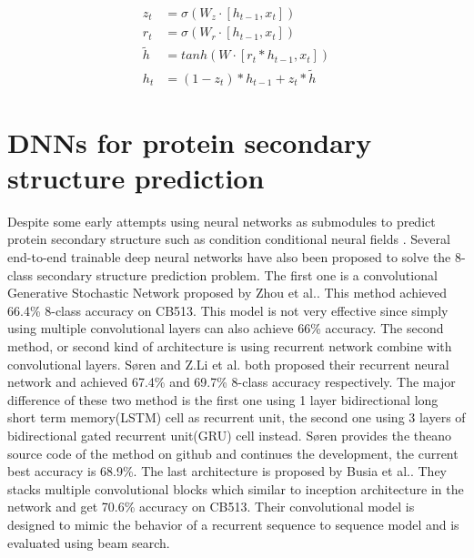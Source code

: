 \begin{subequations} 
    \begin{align}
    	z_t &= \sigma(W_z\cdot [h_{t-1}, x_t]) \label{eq:GRU0}\\ 
        r_t &= \sigma(W_r\cdot [h_{t-1}, x_t]) \label{eq:GRU1}\\
        \tilde{h} &= tanh(W\cdot [r_t\ast h_{t-1}, x_t]) \label{eq:GRU2}\\
        h_t &= (1 -z_t)\ast h_{t-1} + z_t\ast \tilde{h} \label{eq:GRU3}
    \end{align}	
\end{subequations}

\section{DNNs for protein secondary structure prediction}
Despite some early attempts using neural networks as submodules to predict protein secondary structure such as condition conditional neural fields \cite{wang2011protein}. Several end-to-end trainable deep neural networks have also been proposed to solve the 8-class secondary structure prediction problem. The first one is a convolutional Generative Stochastic Network proposed by Zhou et al.\cite{zhou2014deep}. This method achieved 66.4\% 8-class accuracy on CB513. This model is not very effective since simply using multiple convolutional layers can also achieve 66\% accuracy. The second method, or second kind of architecture is using recurrent network combine with convolutional layers. Søren\cite{sonderby2014protein} and Z.Li et al. \cite{Z.Li2016} both proposed their recurrent neural network and achieved 67.4\% and 69.7\% 8-class accuracy respectively. The major difference of these two method is the first one using 1 layer bidirectional long short term memory(LSTM) cell as recurrent unit, the second one using 3 layers of bidirectional gated recurrent unit(GRU) cell instead. Søren provides the theano source code of the method on github and continues the development, the current best accuracy is 68.9\%. The last architecture is proposed by Busia et al.\cite{busia2016protein}. They stacks multiple convolutional blocks which similar to inception architecture in the network and get 70.6\% accuracy on CB513. Their convolutional model is designed to mimic the behavior of a recurrent sequence to sequence model and is evaluated using beam search. 
